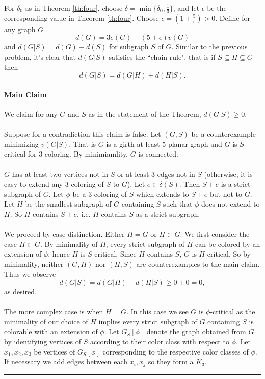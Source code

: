 \documentclass[letterpaper,12pt,oneside,onecolumn]{article}
\newenvironment{proof}{{\bf Proof:  }}{\hfill\rule{2mm}{2mm}}
\begin{document}
\begin{proof}
	For $\delta_0$ as in Theorem \ref{th:four}, choose $\delta = \min\{\delta_0, \frac{1}{3}\}$, and let $\epsilon$ be the corresponding value in Theorem \ref{th:four}. Choose $c = (1+\frac{5}{\epsilon}) > 0$. Define for any graph $G$
	$$d(G) = 3e(G) - (5+\epsilon)v(G)$$
	and $d(G|S) = d(G) - d(S)$ for subgraph $S$ of $G$. Similar to the previous problem, it's clear that $d(G|S)$ satisfies the ``chain rule", that is if $S\subseteq H \subseteq G$ then
	$$d(G|S) = d(G|H) + d(H|S).$$
	\paragraph{Main Claim}
	We claim for any $G$ and $S$ as in the statement of the Theorem, $d(G|S) \geq 0$.
	\paragraph{}
	Suppose for a contradiction this claim is false. Let $(G,S)$ be a counterexample minimizing $v(G|S)$. That is $G$ is a girth at least $5$ planar graph and $G$ is $S$-critical for $3$-coloring. By minimiamlity, $G$ is connected.
	\paragraph{}
	$G$ has at least two vertices not in $S$ or at least $3$ edges not in $S$ (otherwise, it is easy to extend any $3$-coloring of $S$ to $G$). Let $e \in \delta(S)$. Then $S+e$ is a strict subgraph of $G$. Let $\phi$ be a $3$-coloring of $S$ which extends to $S+e$ but not to $G$. Let $H$ be the smallest subgraph of $G$ containing $S$ such that $\phi$ does not extend to $H$. So $H$ contains $S+e$, i.e. $H$ contains $S$ as a strict subgraph.
	\paragraph{}
	We proceed by case distinction. Either $H=G$ or $H\subset G$. We first consider the case $H \subset G$. By minimality of $H$, every strict subgraph of $H$ can be colored by an extension of $\phi$. hence $H$ is $S$-critical. Since $H$ contains $S$, $G$ is $H$-critical. So by minimality, neither $(G,H)$ nor $(H,S)$ are counterexamples to the main claim. Thus we observe
	$$d(G|S) = d(G|H) + d(H|S) \geq 0 + 0 = 0,$$
	as desired.
	\paragraph{}
	The more complex case is when $H=G$. In this case we see $G$ is $\phi$-critical as the minimality of our choice of $H$ implies every strict subgraph of $G$ containing $S$ is colorable with an extension of $\phi$. Let $G_S[\phi]$ denote the graph obtained from $G$ by identifying vertices of $S$ according to their color class with respect to $\phi$. Let $x_1, x_2, x_3$ be vertices of $G_S[\phi]$ corresponding to the respective color classes of $\phi$. If necessary we add edges between each $x_i, x_j$ so they form a $K_3$.

\end{proof}
\end{document}
